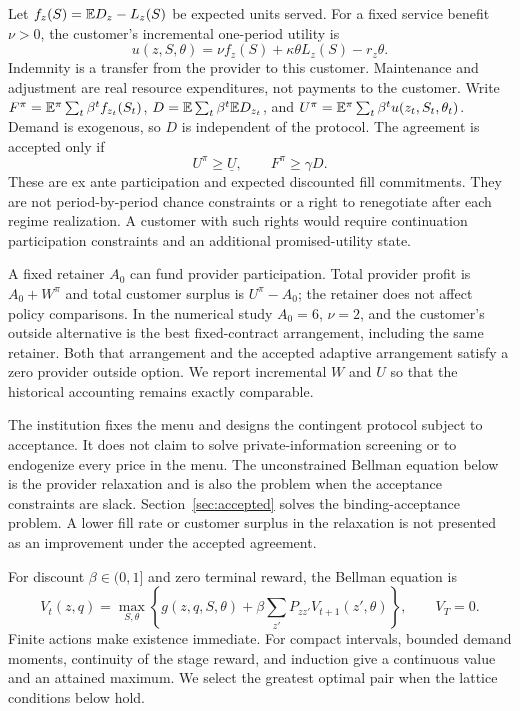 Let $f_z(S)=\mathbb E D_z-L_z(S)$ be expected units served. For a fixed service benefit $\nu>0$, the customer's incremental one-period utility is
\begin{equation}\label{eq:customer}
 u(z,S,\theta)=\nu f_z(S)+\kappa\theta L_z(S)-r_z\theta.
\end{equation}
Indemnity is a transfer from the provider to this customer. Maintenance and adjustment are real resource expenditures, not payments to the customer. Write $F^\pi=\mathbb E^\pi\sum_t\beta^t f_{z_t}(S_t)$, $D=\mathbb E\sum_t\beta^t\mathbb E D_{z_t}$, and $U^\pi=\mathbb E^\pi\sum_t\beta^t u(z_t,S_t,\theta_t)$. Demand is exogenous, so $D$ is independent of the protocol. The agreement is accepted only if
\begin{equation}\label{eq:participation}
 U^\pi\geq\underline U,\qquad F^\pi\geq\gamma D.
\end{equation}
These are ex ante participation and expected discounted fill commitments. They are not period-by-period chance constraints or a right to renegotiate after each regime realization. A customer with such rights would require continuation participation constraints and an additional promised-utility state.

A fixed retainer $A_0$ can fund provider participation. Total provider profit is $A_0+W^\pi$ and total customer surplus is $U^\pi-A_0$; the retainer does not affect policy comparisons. In the numerical study $A_0=6$, $\nu=2$, and the customer's outside alternative is the best fixed-contract arrangement, including the same retainer. Both that arrangement and the accepted adaptive arrangement satisfy a zero provider outside option. We report incremental $W$ and $U$ so that the historical accounting remains exactly comparable.

The institution fixes the menu and designs the contingent protocol subject to acceptance. It does not claim to solve private-information screening or to endogenize every price in the menu. The unconstrained Bellman equation below is the provider relaxation and is also the problem when the acceptance constraints are slack. Section~\ref{sec:accepted} solves the binding-acceptance problem. A lower fill rate or customer surplus in the relaxation is not presented as an improvement under the accepted agreement.

For discount $\beta\in(0,1]$ and zero terminal reward, the Bellman equation is
\begin{equation}\label{eq:bellman}
 V_t(z,q)=\max_{S,\theta}\left\{g(z,q,S,\theta)
       +\beta\sum_{z'}P_{zz'}V_{t+1}(z',\theta)\right\},\qquad V_T=0.
\end{equation}
Finite actions make existence immediate. For compact intervals, bounded demand moments, continuity of the stage reward, and induction give a continuous value and an attained maximum. We select the greatest optimal pair when the lattice conditions below hold.

